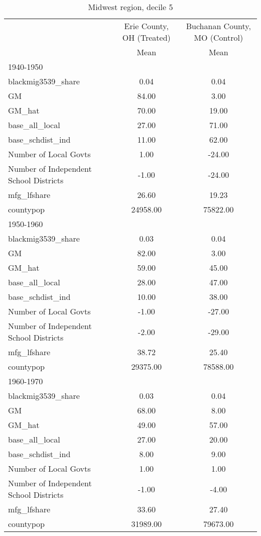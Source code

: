 \begin{table}[htbp]\centering
\def\sym#1{\ifmmode^{#1}\else\(^{#1}\)\fi}
\caption{Midwest region, decile 5 \label{tab1}}
\begin{tabular}{l*{2}{c}}
\toprule
                    &\multicolumn{1}{c}{Erie County, OH (Treated)}&\multicolumn{1}{c}{Buchanan County, MO (Control)}\\
                    &        Mean&        Mean\\
\midrule
1940-1950           &            &            \\
blackmig3539\_share  &        0.04&        0.04\\
GM                  &       84.00&        3.00\\
GM\_hat              &       70.00&       19.00\\
base\_all\_local      &       27.00&       71.00\\
base\_schdist\_ind    &       11.00&       62.00\\
Number of Local Govts&        1.00&      -24.00\\
Number of Independent School Districts&       -1.00&      -24.00\\
mfg\_lfshare         &       26.60&       19.23\\
countypop           &    24958.00&    75822.00\\
\midrule
1950-1960           &            &            \\
blackmig3539\_share  &        0.03&        0.04\\
GM                  &       82.00&        3.00\\
GM\_hat              &       59.00&       45.00\\
base\_all\_local      &       28.00&       47.00\\
base\_schdist\_ind    &       10.00&       38.00\\
Number of Local Govts&       -1.00&      -27.00\\
Number of Independent School Districts&       -2.00&      -29.00\\
mfg\_lfshare         &       38.72&       25.40\\
countypop           &    29375.00&    78588.00\\
\midrule
1960-1970           &            &            \\
blackmig3539\_share  &        0.03&        0.04\\
GM                  &       68.00&        8.00\\
GM\_hat              &       49.00&       57.00\\
base\_all\_local      &       27.00&       20.00\\
base\_schdist\_ind    &        8.00&        9.00\\
Number of Local Govts&        1.00&        1.00\\
Number of Independent School Districts&       -1.00&       -4.00\\
mfg\_lfshare         &       33.60&       27.40\\
countypop           &    31989.00&    79673.00\\
\bottomrule
\end{tabular}
\end{table}
